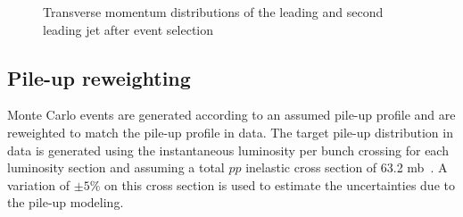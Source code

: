   \begin{figure}
  \centering
  \caption{Transverse momentum distributions of the leading and second leading jet after event selection}\label{fig:jetpt}
  \end{figure}

  



  \subsection{Pile-up reweighting}
  Monte Carlo events are generated according to an assumed pile-up profile and are reweighted to match the pile-up profile in data. 
  The target pile-up distribution in data is generated using the instantaneous luminosity per bunch crossing for each luminosity section
  and assuming a total $pp$ inelastic cross section of 63.2 mb~\cite{twiki:pu}. A variation of $\pm 5\%$  on this cross section is used to estimate the uncertainties due to the pile-up modeling.

